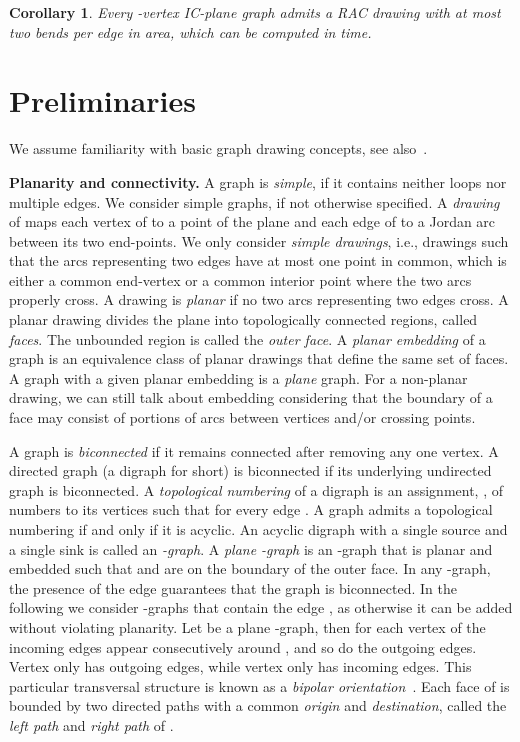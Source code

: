 \documentclass[a4paper]{article}
\newtheorem{corollary}{Corollary}
\begin{document}
\begin{corollary}\label{co:main}
Every -vertex IC-plane graph  admits a RAC drawing with at most two bends per edge in  area, which can be computed in  time.
\end{corollary}




\section{Preliminaries}\label{se:preliminaries}
We assume familiarity with basic graph drawing concepts, see also~\cite{dett-gd-99}. 

{\bf Planarity and connectivity.} A graph  is \emph{simple}, if it contains neither loops nor multiple edges. We consider simple graphs, if not otherwise specified. A \emph{drawing}  of  maps each vertex of  to a point of the plane and each edge of  to a Jordan arc between its two end-points. We only consider \emph{simple drawings}, i.e., drawings such that the arcs representing two edges have at most one point in common, which is either a common end-vertex or a common interior point where the two arcs properly cross. A drawing is \emph{planar} if no two arcs representing two edges cross. A planar drawing divides the plane into topologically connected regions, called \emph{faces}. The unbounded region is called the \emph{outer face}. A \emph{planar embedding} of a graph is an equivalence class of planar drawings that define the same set of faces. A graph with a given planar embedding is a \emph{plane} graph. For a non-planar drawing, we can still talk about embedding considering that the boundary of a face may consist of portions of arcs between vertices and/or crossing points. 

A graph is \emph{biconnected} if it remains connected after removing any one vertex. A directed graph (a digraph for short) is biconnected if its underlying undirected graph is biconnected. A \emph{topological numbering} of a digraph is an assignment, , of numbers to its vertices such that  for every edge . A graph admits a topological numbering if and only if it is acyclic. An acyclic digraph with a single source  and a single sink  is called an \emph{-graph}. A \emph{plane -graph} is an -graph that is planar and embedded such that  and  are on the boundary of the outer face. In any -graph, the presence of the edge  guarantees that the graph is biconnected. In the following we consider -graphs that contain the edge , as otherwise it can be added without violating planarity. Let  be a plane -graph, then for each vertex  of  the incoming edges appear consecutively around , and so do the outgoing edges. Vertex  only has outgoing edges, while vertex  only has incoming edges. This particular transversal structure is known as a \emph{bipolar orientation}~\cite{DBLP:journals/dcg/RosenstiehlT86,TamassiaTollis86}. Each face  of  is bounded by two directed paths with a common \emph{origin} and \emph{destination}, called the \emph{left path} and \emph{right path} of . 
\end{document}
